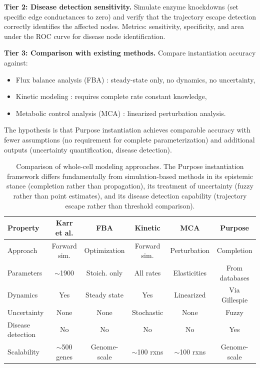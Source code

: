 \documentclass[twocolumn,10pt,a4paper]{article}
\theoremstyle{definition}
\theoremstyle{remark}
\begin{document}
\textbf{Tier 2: Disease detection sensitivity.} Simulate enzyme knockdowns (set specific edge conductances to zero) and verify that the trajectory escape detection correctly identifies the affected nodes. Metrics: sensitivity, specificity, and area under the ROC curve for disease node identification.

\textbf{Tier 3: Comparison with existing methods.} Compare instantiation accuracy against:
\begin{itemize}[nosep]
    \item Flux balance analysis (FBA) \citep{Orth2010}: steady-state only, no dynamics, no uncertainty,
    \item Kinetic modeling \citep{vanKampen2007}: requires complete rate constant knowledge,
    \item Metabolic control analysis (MCA) \citep{Fell1992}: linearized perturbation analysis.
\end{itemize}
The hypothesis is that Purpose instantiation achieves comparable accuracy with fewer assumptions (no requirement for complete parameterization) and additional outputs (uncertainty quantification, disease detection).

\begin{table}[t]
\centering
\caption{Comparison of whole-cell modeling approaches. The Purpose instantiation framework differs fundamentally from simulation-based methods in its epistemic stance (completion rather than propagation), its treatment of uncertainty (fuzzy rather than point estimates), and its disease detection capability (trajectory escape rather than threshold comparison).}
\label{tab:comparison}
\begin{tabular}{@{}lccccc@{}}
\toprule
\textbf{Property} & \textbf{Karr et al.} & \textbf{FBA} & \textbf{Kinetic} & \textbf{MCA} & \textbf{Purpose} \\
\midrule
Approach & Forward sim. & Optimization & Forward sim. & Perturbation & Completion \\
Parameters & $\sim$1900 & Stoich. only & All rates & Elasticities & From databases \\
Dynamics & Yes & Steady state & Yes & Linearized & Via Gillespie \\
Uncertainty & None & None & Stochastic & None & Fuzzy \\
Disease detection & No & No & No & No & Yes \\
Scalability & $\sim$500 genes & Genome-scale & $\sim$100 rxns & $\sim$100 rxns & Genome-scale \\
\bottomrule
\end{tabular}
\end{table}
\end{document}
